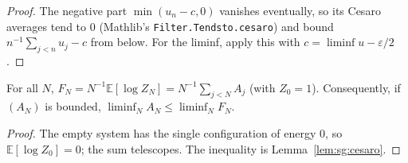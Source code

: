 \begin{proof}
  \leanok
The negative part $\min(u_n-c,0)$ vanishes eventually, so its Cesaro averages tend to $0$ (Mathlib's \texttt{Filter.Tendsto.cesaro}) and bound
$n^{-1}\sum_{j<n}u_j-c$ from below. For the liminf, apply this with $c=\liminf u-\varepsilon/2$.
\end{proof}

\begin{theorem}\label{thm:sg:cesaro}
  \leanok
For all $N$, $F_N=N^{-1}\mathbb E[\log Z_N]=N^{-1}\sum_{j<N}A_j$ (with $Z_0=1$). Consequently, if $(A_N)$ is bounded,
$\liminf_NA_N\le\liminf_NF_N$.
\end{theorem}

\begin{proof}
  \leanok
The empty system has the single configuration of energy $0$, so $\mathbb E[\log Z_0]=0$; the sum telescopes. The inequality is Lemma~\ref{lem:sg:cesaro}.
\end{proof}

